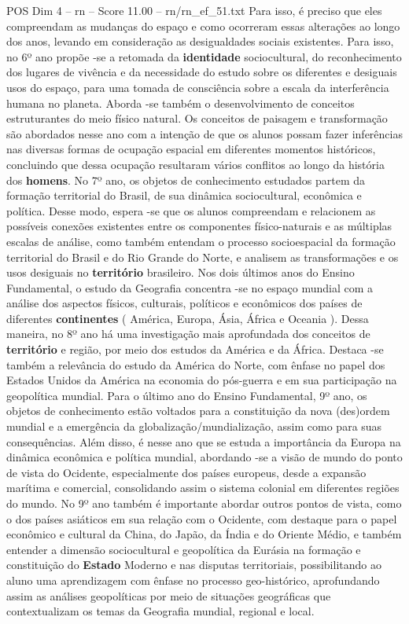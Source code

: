 \begin{textsample}{POS Dim 4 – rn – Score 11.00 – rn/rn\_ef\_51.txt}
Para isso, é preciso que eles compreendam as mudanças do espaço e como ocorreram essas alterações ao longo dos anos, levando em consideração as desigualdades sociais existentes.
Para isso, no 6º ano propõe -se a retomada da \textbf{identidade} sociocultural, do reconhecimento dos lugares de vivência e da necessidade do estudo sobre os diferentes e desiguais usos do espaço, para uma tomada de consciência sobre a escala da interferência humana no planeta.
Aborda -se também o desenvolvimento de conceitos estruturantes do meio físico natural.
Os conceitos de paisagem e transformação são abordados nesse ano com a intenção de que os alunos possam fazer inferências nas diversas formas de ocupação espacial em diferentes momentos históricos, concluindo que dessa ocupação resultaram vários conflitos ao longo da história dos \textbf{homens}.
No 7º ano, os objetos de conhecimento estudados partem da formação territorial do Brasil, de sua dinâmica sociocultural, econômica e política.
Desse modo, espera -se que os alunos compreendam e relacionem as possíveis conexões existentes entre os componentes físico-naturais e as múltiplas escalas de análise, como também entendam o processo socioespacial da formação territorial do Brasil e do Rio Grande do Norte, e analisem as transformações e os usos desiguais no \textbf{território} brasileiro.
Nos dois últimos anos do Ensino Fundamental, o estudo da Geografia concentra -se no espaço mundial com a análise dos aspectos físicos, culturais, políticos e econômicos dos países de diferentes \textbf{continentes} ( América, Europa, Ásia, África e Oceania ).
Dessa maneira, no 8º ano há uma investigação mais aprofundada dos conceitos de \textbf{território} e região, por meio dos estudos da América e da África.
Destaca -se também a relevância do estudo da América do Norte, com ênfase no papel dos Estados Unidos da América na economia do pós-guerra e em sua participação na geopolítica mundial.
Para o último ano do Ensino Fundamental, 9º ano, os objetos de conhecimento estão voltados para a constituição da nova (des)ordem mundial e a emergência da globalização/mundialização, assim como para suas consequências.
Além disso, é nesse ano que se estuda a importância da Europa na dinâmica econômica e política mundial, abordando -se a visão de mundo do ponto de vista do Ocidente, especialmente dos países europeus, desde a expansão marítima e comercial, consolidando assim o sistema colonial em diferentes regiões do mundo.
No 9º ano também é importante abordar outros pontos de vista, como o dos países asiáticos em sua relação com o Ocidente, com destaque para o papel econômico e cultural da China, do Japão, da Índia e do Oriente Médio, e também entender a dimensão sociocultural e geopolítica da Eurásia na formação e constituição do \textbf{Estado} Moderno e nas disputas territoriais, possibilitando ao aluno uma aprendizagem com ênfase no processo geo-histórico, aprofundando assim as análises geopolíticas por meio de situações geográficas que contextualizam os temas da Geografia mundial, regional e local.

\end{textsample}
